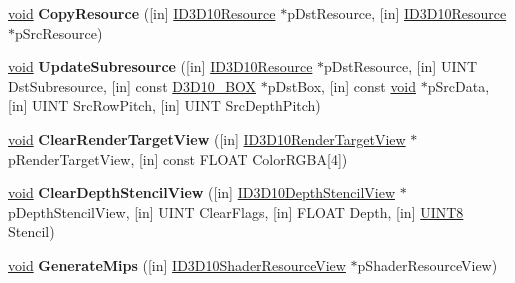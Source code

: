 \begin{DoxyCompactItemize}
\item 
\mbox{\label{interface_i_d3_d10_device_a67b856cb6bdb531fe612a8cbd24e59a9}} 
\hyperlink{interfacevoid}{void} {\bfseries Copy\+Resource} (\mbox{[}in\mbox{]} \hyperlink{interface_i_d3_d10_resource}{I\+D3\+D10\+Resource} $\ast$p\+Dst\+Resource, \mbox{[}in\mbox{]} \hyperlink{interface_i_d3_d10_resource}{I\+D3\+D10\+Resource} $\ast$p\+Src\+Resource)
\item 
\mbox{\label{interface_i_d3_d10_device_a347f857f9c4a1d950cfa899d3bc3bc5c}} 
\hyperlink{interfacevoid}{void} {\bfseries Update\+Subresource} (\mbox{[}in\mbox{]} \hyperlink{interface_i_d3_d10_resource}{I\+D3\+D10\+Resource} $\ast$p\+Dst\+Resource, \mbox{[}in\mbox{]} U\+I\+NT Dst\+Subresource, \mbox{[}in\mbox{]} const \hyperlink{struct_d3_d10___b_o_x}{D3\+D10\+\_\+\+B\+OX} $\ast$p\+Dst\+Box, \mbox{[}in\mbox{]} const \hyperlink{interfacevoid}{void} $\ast$p\+Src\+Data, \mbox{[}in\mbox{]} U\+I\+NT Src\+Row\+Pitch, \mbox{[}in\mbox{]} U\+I\+NT Src\+Depth\+Pitch)
\item 
\mbox{\label{interface_i_d3_d10_device_aedba0fc5a07ac09c366b24a535a2f1f7}} 
\hyperlink{interfacevoid}{void} {\bfseries Clear\+Render\+Target\+View} (\mbox{[}in\mbox{]} \hyperlink{interface_i_d3_d10_render_target_view}{I\+D3\+D10\+Render\+Target\+View} $\ast$p\+Render\+Target\+View, \mbox{[}in\mbox{]} const F\+L\+O\+AT Color\+R\+G\+BA\mbox{[}4\mbox{]})
\item 
\mbox{\label{interface_i_d3_d10_device_a42cb6d501afc4dde94e31dc322e7ad75}} 
\hyperlink{interfacevoid}{void} {\bfseries Clear\+Depth\+Stencil\+View} (\mbox{[}in\mbox{]} \hyperlink{interface_i_d3_d10_depth_stencil_view}{I\+D3\+D10\+Depth\+Stencil\+View} $\ast$p\+Depth\+Stencil\+View, \mbox{[}in\mbox{]} U\+I\+NT Clear\+Flags, \mbox{[}in\mbox{]} F\+L\+O\+AT Depth, \mbox{[}in\mbox{]} \hyperlink{_processor_bind_8h_ab27e9918b538ce9d8ca692479b375b6a}{U\+I\+N\+T8} Stencil)
\item 
\mbox{\label{interface_i_d3_d10_device_a1ae8a887e93e8b5a4fb7506f6387ccff}} 
\hyperlink{interfacevoid}{void} {\bfseries Generate\+Mips} (\mbox{[}in\mbox{]} \hyperlink{interface_i_d3_d10_shader_resource_view}{I\+D3\+D10\+Shader\+Resource\+View} $\ast$p\+Shader\+Resource\+View)

\end{DoxyCompactItemize}
